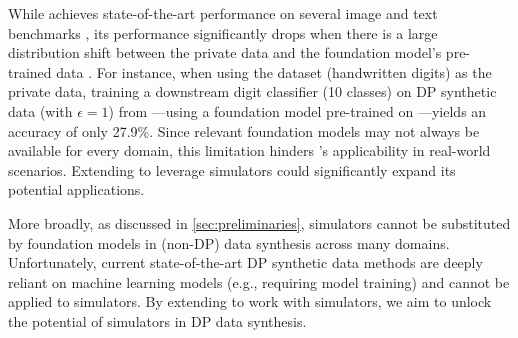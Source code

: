 While \pe{} achieves state-of-the-art performance on several image and text benchmarks \cite{lin2023differentially,xie2024differentially,hou2024pre}, its performance significantly drops when there is a large distribution shift between the private data and the foundation model’s pre-trained data \cite{dpimagebench}. For instance, when using the \mnist{} dataset \cite{lecun1998mnist} (handwritten digits) as the private data, training a downstream digit classifier (10 classes) on DP synthetic data (with $\epsilon=1$) from \pe{}---using a foundation model pre-trained on \imagenet{}---yields an accuracy of only 27.9\%. Since relevant foundation models may not always be available for every domain, this limitation hinders \pe{}'s applicability in real-world scenarios. Extending \pe{} to leverage simulators could significantly expand its potential applications.

More broadly, as discussed in \cref{sec:preliminaries}, simulators cannot be substituted by foundation models in (non-DP) data synthesis across many domains. Unfortunately, current state-of-the-art DP synthetic data methods are deeply reliant on machine learning models (e.g., requiring model training) and cannot be applied to simulators. By extending \pe{} to work with simulators, we aim to unlock the potential of simulators in DP data synthesis.
